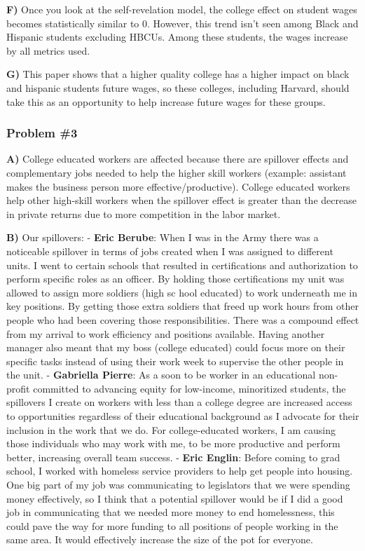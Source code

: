 \documentclass[11pt]{article}
\begin{document}
    \textbf{F)} Once you look at the self-revelation model, the college
effect on student wages becomes statistically similar to 0. However,
this trend isn't seen among Black and Hispanic students excluding HBCUs.
Among these students, the wages increase by all metrics used.

\textbf{G)} This paper shows that a higher quality college has a higher
impact on black and hispanic students future wages, so these colleges,
including Harvard, should take this as an opportunity to help increase
future wages for these groups.

    \hypertarget{problem-3}{%
\subsubsection{Problem \#3}\label{problem-3}}

\textbf{A)} College educated workers are affected because there are
spillover effects and complementary jobs needed to help the higher skill
workers (example: assistant makes the business person more
effective/productive). College educated workers help other high-skill
workers when the spillover effect is greater than the decrease in
private returns due to more competition in the labor market.

\textbf{B)} Our spillovers: - \textbf{Eric Berube}: When I was in the
Army there was a noticeable spillover in terms of jobs created when I
was assigned to different units. I went to certain schools that resulted
in certifications and authorization to perform specific roles as an
officer. By holding those certifications my unit was allowed to assign
more soldiers (high sc hool educated) to work underneath me in key
positions. By getting those extra soldiers that freed up work hours from
other people who had been covering those responsibilities. There was a
compound effect from my arrival to work efficiency and positions
available. Having another manager also meant that my boss (college
educated) could focus more on their specific tasks instead of using
their work week to supervise the other people in the unit. -
\textbf{Gabriella Pierre}: As a soon to be worker in an educational
non-profit committed to advancing equity for low-income, minoritized
students, the spillovers I create on workers with less than a college
degree are increased access to opportunities regardless of their
educational background as I advocate for their inclusion in the work
that we do. For college-educated workers, I am causing those individuals
who may work with me, to be more productive and perform better,
increasing overall team success. - \textbf{Eric Englin}: Before coming
to grad school, I worked with homeless service providers to help get
people into housing. One big part of my job was communicating to
legislators that we were spending money effectively, so I think that a
potential spillover would be if I did a good job in communicating that
we needed more money to end homelessness, this could pave the way for
more funding to all positions of people working in the same area. It
would effectively increase the size of the pot for everyone.
\end{document}
